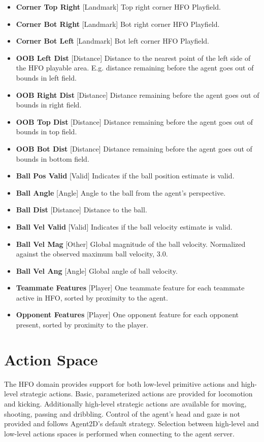 \documentclass[12pt]{article}
\begin{document}
\begin{itemize}
  \item{\textbf{Corner Top Right} [Landmark] Top right corner HFO Playfield.}
  \item{\textbf{Corner Bot Right} [Landmark] Bot right corner HFO Playfield.}
  \item{\textbf{Corner Bot Left} [Landmark] Bot left corner HFO Playfield.}
  \item{\textbf{OOB Left Dist} [Distance] Distance to the nearest
    point of the left side of the HFO playable area. E.g. distance
    remaining before the agent goes out of bounds in left field.}
  \item{\textbf{OOB Right Dist} [Distance] Distance remaining before
    the agent goes out of bounds in right field.}
  \item{\textbf{OOB Top Dist} [Distance] Distance remaining before
    the agent goes out of bounds in top field.}
  \item{\textbf{OOB Bot Dist} [Distance] Distance remaining before
    the agent goes out of bounds in bottom field.}
  \item{\textbf{Ball Pos Valid} [Valid] Indicates if the ball position estimate is valid.}
  \item{\textbf{Ball Angle} [Angle] Angle to the ball from the agent's perspective.}
  \item{\textbf{Ball Dist} [Distance] Distance to the ball.}
  \item{\textbf{Ball Vel Valid} [Valid] Indicates if the ball velocity estimate is valid.}
  \item{\textbf{Ball Vel Mag} [Other] Global magnitude of the ball velocity. Normalized against the observed maximum ball velocity, 3.0.}
  \item{\textbf{Ball Vel Ang} [Angle] Global angle of ball velocity.}
  \item{\textbf{Teammate Features} [Player] One teammate feature for each teammate active in HFO, sorted by proximity to the agent.}
  \item{\textbf{Opponent Features} [Player] One opponent feature for each opponent present, sorted by proximity to the player.}
\end{itemize}

\section{Action Space}
The HFO domain provides support for both low-level primitive actions
and high-level strategic actions. Basic, parameterized actions are
provided for locomotion and kicking. Additionally high-level strategic
actions are available for moving, shooting, passing and
dribbling. Control of the agent's head and gaze is not provided and
follows Agent2D's default strategy. Selection between high-level and
low-level actions spaces is performed when connecting to the agent
server.
\end{document}
